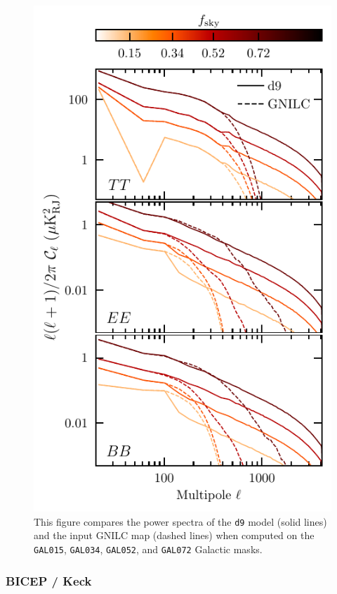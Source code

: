 \documentclass[twocolumn]{aastex631}
\newcommand{\dnine}{{\tt d9}}
\begin{document}
\begin{figure}
    \centering
    \includegraphics{paper_spectra_by_field_NSIDE2048.pdf}
    \caption{This figure compares the power spectra of the \dnine{} model (solid lines) and the input GNILC map (dashed lines) when computed on the \texttt{GAL015}, \texttt{GAL034}, \texttt{GAL052}, and \texttt{GAL072} Galactic masks.}
    \label{fig:spectra_by_field}
\end{figure}

\subsubsection{BICEP / Keck} \label{sec:bkspt_spectra}
\end{document}
